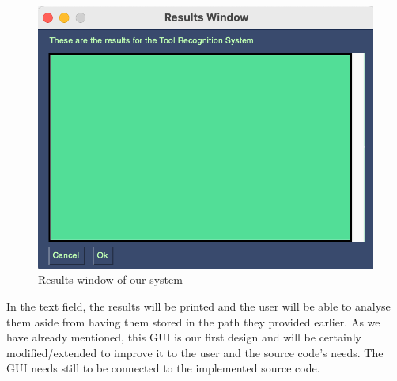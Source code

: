 \documentclass{article}
\begin{document}
\begin{figure}[H]
    \centering
    \includegraphics[width = 0.8\linewidth]{Results_window.png}
    \caption{Results window of our system}
    \label{fig:results}
\end{figure}
\noindent
In the text field, the results will be printed and the user will be able to analyse them aside from having them stored in the path they provided earlier.
\noindent
As we have already mentioned, this GUI is our first design and will be certainly modified/extended to improve it to the user and the source code's needs. The GUI needs still to be connected to the implemented source code.
\end{document}
